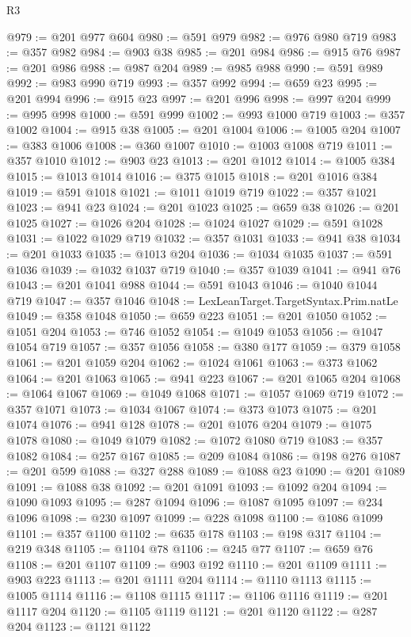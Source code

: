 \begin{lexlean}{R3}
\begin{coremodule}
@979 := @201 @977 @604
@980 := @591 @979
@982 := @976 @980 @719
@983 := @357 @982
@984 := @903 @38
@985 := @201 @984
@986 := @915 @76
@987 := @201 @986
@988 := @987 @204
@989 := @985 @988
@990 := @591 @989
@992 := @983 @990 @719
@993 := @357 @992
@994 := @659 @23
@995 := @201 @994
@996 := @915 @23
@997 := @201 @996
@998 := @997 @204
@999 := @995 @998
@1000 := @591 @999
@1002 := @993 @1000 @719
@1003 := @357 @1002
@1004 := @915 @38
@1005 := @201 @1004
@1006 := @1005 @204
@1007 := @383 @1006
@1008 := @360 @1007
@1010 := @1003 @1008 @719
@1011 := @357 @1010
@1012 := @903 @23
@1013 := @201 @1012
@1014 := @1005 @384
@1015 := @1013 @1014
@1016 := @375 @1015
@1018 := @201 @1016 @384
@1019 := @591 @1018
@1021 := @1011 @1019 @719
@1022 := @357 @1021
@1023 := @941 @23
@1024 := @201 @1023
@1025 := @659 @38
@1026 := @201 @1025
@1027 := @1026 @204
@1028 := @1024 @1027
@1029 := @591 @1028
@1031 := @1022 @1029 @719
@1032 := @357 @1031
@1033 := @941 @38
@1034 := @201 @1033
@1035 := @1013 @204
@1036 := @1034 @1035
@1037 := @591 @1036
@1039 := @1032 @1037 @719
@1040 := @357 @1039
@1041 := @941 @76
@1043 := @201 @1041 @988
@1044 := @591 @1043
@1046 := @1040 @1044 @719
@1047 := @357 @1046
@1048 := LexLeanTarget.TargetSyntax.Prim.natLe
@1049 := @358 @1048
@1050 := @659 @223
@1051 := @201 @1050
@1052 := @1051 @204
@1053 := @746 @1052
@1054 := @1049 @1053
@1056 := @1047 @1054 @719
@1057 := @357 @1056
@1058 := @380 @177
@1059 := @379 @1058
@1061 := @201 @1059 @204
@1062 := @1024 @1061
@1063 := @373 @1062
@1064 := @201 @1063
@1065 := @941 @223
@1067 := @201 @1065 @204
@1068 := @1064 @1067
@1069 := @1049 @1068
@1071 := @1057 @1069 @719
@1072 := @357 @1071
@1073 := @1034 @1067
@1074 := @373 @1073
@1075 := @201 @1074
@1076 := @941 @128
@1078 := @201 @1076 @204
@1079 := @1075 @1078
@1080 := @1049 @1079
@1082 := @1072 @1080 @719
@1083 := @357 @1082
@1084 := @257 @167
@1085 := @209 @1084
@1086 := @198 @276
@1087 := @201 @599
@1088 := @327 @288
@1089 := @1088 @23
@1090 := @201 @1089
@1091 := @1088 @38
@1092 := @201 @1091
@1093 := @1092 @204
@1094 := @1090 @1093
@1095 := @287 @1094
@1096 := @1087 @1095
@1097 := @234 @1096
@1098 := @230 @1097
@1099 := @228 @1098
@1100 := @1086 @1099
@1101 := @357 @1100
@1102 := @635 @178
@1103 := @198 @317
@1104 := @219 @348
@1105 := @1104 @78
@1106 := @245 @77
@1107 := @659 @76
@1108 := @201 @1107
@1109 := @903 @192
@1110 := @201 @1109
@1111 := @903 @223
@1113 := @201 @1111 @204
@1114 := @1110 @1113
@1115 := @1005 @1114
@1116 := @1108 @1115
@1117 := @1106 @1116
@1119 := @201 @1117 @204
@1120 := @1105 @1119
@1121 := @201 @1120
@1122 := @287 @204
@1123 := @1121 @1122

\end{coremodule}
\end{lexlean}
